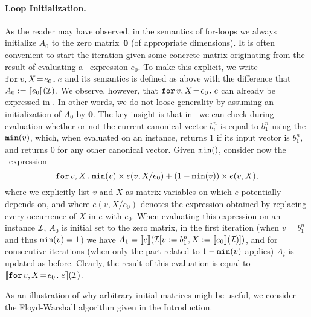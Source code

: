 \paragraph{Loop Initialization.} As the reader may have observed, in the semantics of for-loops we 
always initialize $A_0$ to the zero matrix~$\mathbf{0}$ (of appropriate dimensions). It is often convenient
to start the iteration given some concrete matrix  originating from the result of evaluating a \langfor\ expression $e_0$. To make this explicit, we write $\initf{e_0}{v}{X}{e}$ and its semantics is defined as above
with the difference that $A_0:=\sem{e_0}{\I}$. We observe, however, that $\initf{e_0}{v}{X}{e}$ can already
be expressed in \langfor. In other words, we do not loose generality by assuming an initialization of $A_0$ by $\mathbf{0}$.
The key insight is that in \langfor\ we can check during evaluation whether or not
the current canonical vector $b_i^n$ is equal to $b_1^n$ using the
$\mmin{v}$, which, when evaluated on an instance, returns $1$ if its input vector is $b_1^n$, and returns $0$ for any other canonical vector. Given $\mmin$, consider now the
\langfor\ expression
 $$\ffor{v}{X}{\mmin{v}\times e(v,X/e_0) + (1-\mmin{v})\times e(v,X)},$$
 where we explicitly list $v$ and $X$ as matrix variables on which $e$ potentially depends on, and where
 $e(v,X/e_0)$ denotes the expression obtained by replacing every occurrence of $X$ in $e$ with $e_0$.
When evaluating this expression on an instance $\I$, $A_0$ is initial set to the zero matrix, in the first iteration (when  $v=b_1^n$ and thus $\mmin{v}=1$)
we have $A_1=\sem{e}{\I[v:=b_1^n,X:=\sem{e_0}{\I}]}$, and for consecutive iterations (when only the part related to $1-\mmin{v}$ applies) $A_i$ is updated as before. Clearly, the result of this evaluation is equal to
$\sem{\initf{e_0}{v}{X}{e}}{\I}$.


As an illustration of why arbitrary initial matrices migh be useful, we consider the Floyd-Warshall algorithm given in the Introduction. 

